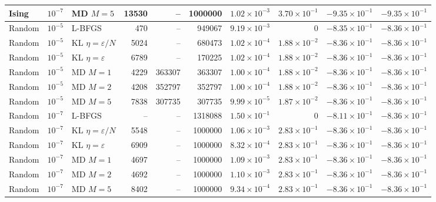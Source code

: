 \begin{table}[t]
\begin{tabular}{lllrrrrrrr}
Ising & $10^{-7}$ & MD $M=5$ & 13530 & -- & 1000000 & $1.02\times 10^{-3}$ & $3.70\times 10^{-1}$ & $-9.35\times 10^{-1}$ & $-9.35\times 10^{-1}$ \\
\midrule
Random & $10^{-5}$ & L-BFGS & 470 & -- & 949067 & $9.19\times 10^{-3}$ & 0 & $-8.35\times 10^{-1}$ & $-8.36\times 10^{-1}$ \\
Random & $10^{-5}$ & KL $\eta=\varepsilon/N$ & 5024 & -- & 680473 & $1.02\times 10^{-4}$ & $1.88\times 10^{-2}$ & $-8.36\times 10^{-1}$ & $-8.36\times 10^{-1}$ \\
Random & $10^{-5}$ & KL $\eta=\varepsilon$ & 6789 & -- & 170225 & $1.02\times 10^{-4}$ & $1.88\times 10^{-2}$ & $-8.36\times 10^{-1}$ & $-8.36\times 10^{-1}$ \\
Random & $10^{-5}$ & MD $M=1$ & 4229 & 363307 & 363307 & $1.00\times 10^{-4}$ & $1.88\times 10^{-2}$ & $-8.36\times 10^{-1}$ & $-8.36\times 10^{-1}$ \\
Random & $10^{-5}$ & MD $M=2$ & 4208 & 352797 & 352797 & $1.00\times 10^{-4}$ & $1.88\times 10^{-2}$ & $-8.36\times 10^{-1}$ & $-8.36\times 10^{-1}$ \\
Random & $10^{-5}$ & MD $M=5$ & 7838 & 307735 & 307735 & $9.99\times 10^{-5}$ & $1.87\times 10^{-2}$ & $-8.36\times 10^{-1}$ & $-8.36\times 10^{-1}$ \\
\midrule
Random & $10^{-7}$ & L-BFGS & -- & -- & 1318088 & $1.50\times 10^{-1}$ & 0 & $-8.11\times 10^{-1}$ & $-8.36\times 10^{-1}$ \\
Random & $10^{-7}$ & KL $\eta=\varepsilon/N$ & 5548 & -- & 1000000 & $1.06\times 10^{-3}$ & $2.83\times 10^{-1}$ & $-8.36\times 10^{-1}$ & $-8.36\times 10^{-1}$ \\
Random & $10^{-7}$ & KL $\eta=\varepsilon$ & 6909 & -- & 1000000 & $8.32\times 10^{-4}$ & $2.83\times 10^{-1}$ & $-8.36\times 10^{-1}$ & $-8.36\times 10^{-1}$ \\
Random & $10^{-7}$ & MD $M=1$ & 4697 & -- & 1000000 & $1.09\times 10^{-3}$ & $2.83\times 10^{-1}$ & $-8.36\times 10^{-1}$ & $-8.36\times 10^{-1}$ \\
Random & $10^{-7}$ & MD $M=2$ & 4692 & -- & 1000000 & $1.10\times 10^{-3}$ & $2.83\times 10^{-1}$ & $-8.36\times 10^{-1}$ & $-8.36\times 10^{-1}$ \\
Random & $10^{-7}$ & MD $M=5$ & 8402 & -- & 1000000 & $9.34\times 10^{-4}$ & $2.83\times 10^{-1}$ & $-8.36\times 10^{-1}$ & $-8.36\times 10^{-1}$ \\
\bottomrule
\end{tabular}
\end{table}